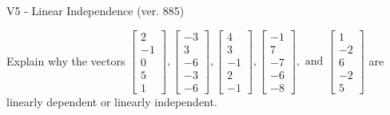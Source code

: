 \begin{exercise}
  \begin{exerciseTitle}V5 - Linear Independence (ver. 885)\end{exerciseTitle}
  \begin{exerciseStatement}
    Explain why the vectors \(\left[\begin{array}{r}
2 \\
-1 \\
0 \\
5 \\
1
\end{array}\right] , \left[\begin{array}{r}
-3 \\
3 \\
-6 \\
-3 \\
-6
\end{array}\right] , \left[\begin{array}{r}
4 \\
3 \\
-1 \\
2 \\
-1
\end{array}\right] , \left[\begin{array}{r}
-1 \\
7 \\
-7 \\
-6 \\
-8
\end{array}\right] , \text{ and } \left[\begin{array}{r}
1 \\
-2 \\
6 \\
-2 \\
5
\end{array}\right]\) are linearly dependent or linearly independent.	



\end{exerciseStatement}
\end{exercise}
